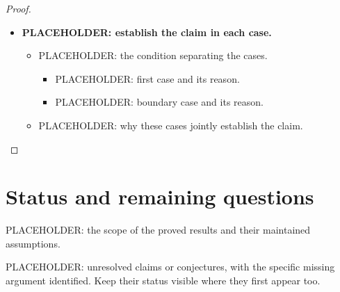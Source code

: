 \documentclass[12pt]{article}
\theoremstyle{remark}
\begin{document}
\begin{proof}
\leavevmode\par
\begin{itemize}
  \item \textbf{PLACEHOLDER: establish the claim in each case.}
    \begin{itemize}
      \item PLACEHOLDER: the condition separating the cases.
        \begin{itemize}
          \item PLACEHOLDER: first case and its reason.
          \item PLACEHOLDER: boundary case and its reason.
        \end{itemize}
      \item PLACEHOLDER: why these cases jointly establish the claim. \qedhere
    \end{itemize}
\end{itemize}
\end{proof}

\clearpage
\section*{Status and remaining questions}

PLACEHOLDER: the scope of the proved results and their maintained assumptions.

PLACEHOLDER: unresolved claims or conjectures, with the specific missing
argument identified. Keep their status visible where they first appear too.
\end{document}
